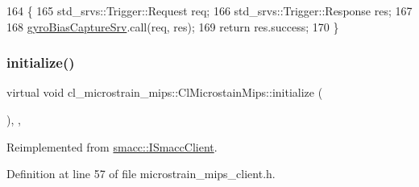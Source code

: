 \begin{DoxyCode}
164     \{
165         std\_srvs::Trigger::Request req;
166         std\_srvs::Trigger::Response res;
167 
168         \hyperlink{classcl__microstrain__mips_1_1ClMicrostainMips_a584ea1089a89cd1039494d0fce19485c}{gyroBiasCaptureSrv}.call(req, res);
169         \textcolor{keywordflow}{return} res.success;
170     \}
\end{DoxyCode}
\mbox{\label{classcl__microstrain__mips_1_1ClMicrostainMips_ab52b739d8230f932ad3042fcd1b697f4}} 
\subsubsection{\texorpdfstring{initialize()}{initialize()}}
{\footnotesize\ttfamily virtual void cl\+\_\+microstrain\+\_\+mips\+::\+Cl\+Microstain\+Mips\+::initialize (\begin{DoxyParamCaption}{ }\end{DoxyParamCaption})\hspace{0.3cm}{\ttfamily [inline]}, {\ttfamily [override]}, {\ttfamily [virtual]}}



Reimplemented from \hyperlink{classsmacc_1_1ISmaccClient_a974ebb6ad6cf812e7b9de6b78b3d901f}{smacc\+::\+I\+Smacc\+Client}.



Definition at line 57 of file microstrain\+\_\+mips\+\_\+client.\+h.


